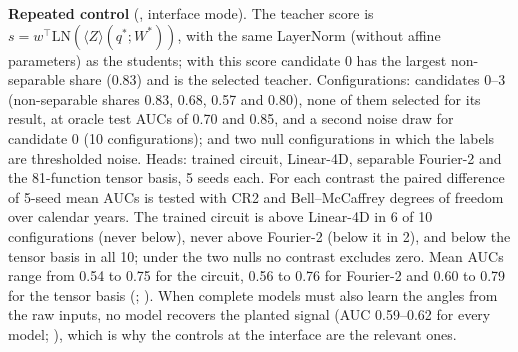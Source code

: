 \documentclass[11pt,a4paper]{article}
\begin{document}
\textbf{Repeated control} (, interface mode). The teacher score is $s=w^\top\mathrm{LN}(\langle Z\rangle(q^\ast;W^\ast))$, with the same LayerNorm (without affine parameters) as the students; with this score candidate 0 has the largest non-separable share (0.83) and is the selected teacher. Configurations: candidates 0--3 (non-separable shares 0.83, 0.68, 0.57 and 0.80), none of them selected for its result, at oracle test AUCs of 0.70 and 0.85, and a second noise draw for candidate 0 (10 configurations); and two null configurations in which the labels are thresholded noise. Heads: trained circuit, Linear-4D, separable Fourier-2 and the 81-function tensor basis, 5 seeds each. For each contrast the paired difference of 5-seed mean AUCs is tested with CR2 and Bell--McCaffrey degrees of freedom over calendar years. The trained circuit is above Linear-4D in 6 of 10 configurations (never below), never above Fourier-2 (below it in 2), and below the tensor basis in all 10; under the two nulls no contrast excludes zero. Mean AUCs range from 0.54 to 0.75 for the circuit, 0.56 to 0.76 for Fourier-2 and 0.60 to 0.79 for the tensor basis (; ). When complete models must also learn the angles from the raw inputs, no model recovers the planted signal (AUC 0.59--0.62 for every model; ), which is why the controls at the interface are the relevant ones.
\end{document}
